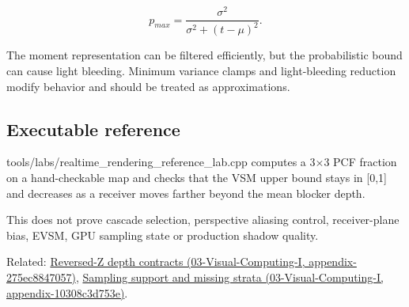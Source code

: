 \[
p_{max}
=
\frac{\sigma^2}
{\sigma^2+(t-\mu)^2}.
\]

The moment representation can be filtered efficiently, but the probabilistic bound can cause light bleeding. Minimum variance clamps and light-bleeding reduction modify behavior and should be treated as approximations.

\subsection{Executable reference}\label{appendix-7cac8a689849-executable-reference}

tools/labs/realtime\_rendering\_reference\_lab.cpp computes a 3×3 PCF fraction on a hand-checkable map and checks that the VSM upper bound stays in {[}0,1{]} and decreases as a receiver moves farther beyond the mean blocker depth.

This does not prove cascade selection, perspective aliasing control, receiver-plane bias, EVSM, GPU sampling state or production shadow quality.

Related: \href{../03-Visual-Computing-I/main.pdf\#nameddest=appendix-275ec8847057}{Reversed-Z depth contracts (03-Visual-Computing-I, appendix-275ec8847057)}, \href{../03-Visual-Computing-I/main.pdf\#nameddest=appendix-10308c3d753e}{Sampling support and missing strata (03-Visual-Computing-I, appendix-10308c3d753e)}.
